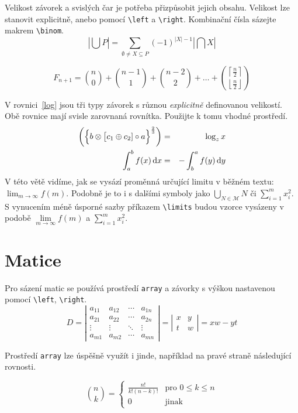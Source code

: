 \documentclass[11pt, a4paper, twocolumn]{article}
\begin{document}
Velikost závorek a svislých čar je potřeba přizpůsobit jejich obsahu. Velikost lze stanovit explicitně, anebo pomocí \verb|\left| a \verb|\right|. Kombinační čísla sázejte makrem \verb|\binom|.
$$
\left| \bigcup P \right| = \sum_{\emptyset \neq X \subseteq P} (-1)^{|X|-1} \left| \bigcap X \right|
$$

$$
F_{n+1} = \binom{n}{0} + \binom{n-1}{1} + \binom{n-2}{2} + \dots + \binom{\left\lceil \frac{n}{2} \right\rceil}{\left\lfloor \frac{n}{2} \right\rfloor}
$$

V rovnici~\eqref{log} jsou tři typy závorek s různou \emph{explicitně} definovanou velikostí. Obě rovnice mají svisle zarovnaná rovnítka. Použijte k tomu vhodné prostředí.
\begin{eqnarray}
\label{log}
\biggl(\Bigl\{b \otimes \bigl[c_1 \oplus c_2] \circ a \Bigr\}^{\frac{2}{3}}\biggr) & = & \log_{z} x \\
\label{int}
\int_a^b f(x) \,\mathrm{d}x & = & - \int_b^a f(y) \,\mathrm{d}y 
\end{eqnarray}
V této větě vidíme, jak se vysází proměnná určující limitu v běžném textu: 
$\lim_{m \rightarrow \infty} f(m)$.
Podobně je to i s dalšími symboly jako 
$\bigcup_{N \in \mathcal{M}}N$ či $\sum_{i=1}^m x_i^2$.
S vynucením méně úsporné sazby příkazem \verb|\limits| budou vzorce vysázeny v podobě 
$\lim\limits_{m \rightarrow \infty} f(m)$ a $\sum\limits_{i=1}^m x_i^2$.

\section{Matice}
Pro sázení matic se používá prostředí \verb|array| a závorky s výškou nastavenou pomocí \verb|\left|, \verb|\right|.
$$
D =
\left|
\begin{array}{cccc}
a_{11} & a_{12} & \cdots & a_{1n} \\
a_{21} & a_{22} & \cdots & a_{2n} \\
\vdots & \vdots & \ddots & \vdots \\
a_{m1} & a_{m2} & \cdots & a_{mn}
\end{array}
\right|
= \left|
\begin{array}{cc}
x & y \\
t & w
\end{array}
\right|
= xw - yt
$$

Prostředí \verb|array| lze úspěšně využít i jinde, například na pravé straně následující rovnosti.

$$
\binom{n}{k} =
\left\{
\begin{array}{ll}
\frac{n!}{k! (n - k)!} & \text{pro } 0 \leq k \leq n \\
0 & \text{jinak}
\end{array}
\right.
$$
\end{document}
